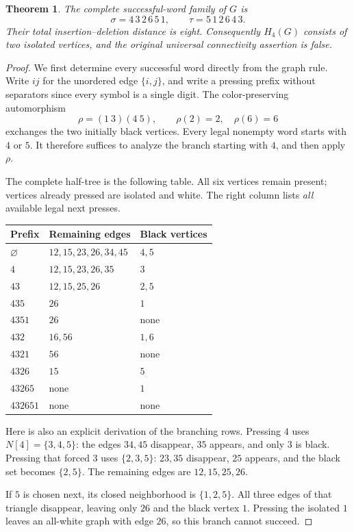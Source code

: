 \documentclass[11pt]{article}
\newtheorem{theorem}{Theorem}
\begin{document}
\begin{theorem}\label{counterexample}
The complete successful-word family of $G$ is
\[
 \sigma=4\,3\,2\,6\,5\,1,
 \qquad
 \tau=5\,1\,2\,6\,4\,3.
\]
Their total insertion--deletion distance is eight. Consequently $H_4(G)$
consists of two isolated vertices, and the original universal connectivity
assertion is false.
\end{theorem}
\begin{proof}
We first determine every successful word directly from the graph rule.
Write $ij$ for the unordered edge $\{i,j\}$, and write a pressing prefix
without separators since every symbol is a single digit. The color-preserving
automorphism
\[
             \rho=(1\ 3)(4\ 5),\qquad \rho(2)=2,\quad\rho(6)=6
\]
exchanges the two initially black vertices. Every legal nonempty word
starts with $4$ or $5$. It therefore suffices to analyze the branch
starting with $4$, and then apply $\rho$.

The complete half-tree is the following table. All six vertices remain
present; vertices already pressed are isolated and white. The right
column lists \emph{all} available legal next presses.
\begin{center}
\begin{tabular}{lll}
\toprule
Prefix & Remaining edges & Black vertices\\
\midrule
$\varnothing$ & $12,15,23,26,34,45$ & $4,5$\\
$4$ & $12,15,23,26,35$ & $3$\\
$43$ & $12,15,25,26$ & $2,5$\\
$435$ & $26$ & $1$\\
$4351$ & $26$ & none\\
$432$ & $16,56$ & $1,6$\\
$4321$ & $56$ & none\\
$4326$ & $15$ & $5$\\
$43265$ & none & $1$\\
$432651$ & none & none\\
\bottomrule
\end{tabular}
\end{center}

Here is also an explicit derivation of the branching rows. Pressing $4$
uses $N[4]=\{3,4,5\}$: the edges $34,45$ disappear, $35$ appears,
and only $3$ is black. Pressing that forced $3$ uses
$\{2,3,5\}$: $23,35$ disappear, $25$ appears, and the black set becomes
$\{2,5\}$. The remaining edges are $12,15,25,26$.

If $5$ is chosen next, its closed neighborhood is $\{1,2,5\}$.
All three edges of that triangle disappear, leaving only $26$ and the
black vertex $1$. Pressing the isolated $1$ leaves an all-white graph
with edge $26$, so this branch cannot succeed.


\end{proof}
\end{document}
